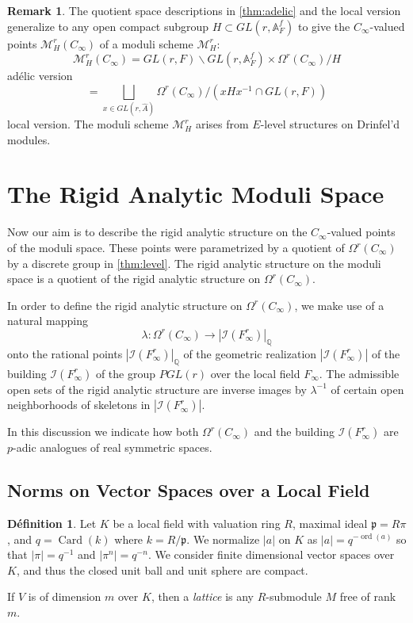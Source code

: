 \documentclass[12pt,a4paper]{article}
\theoremstyle{plain}
\theoremstyle{definition}
\newtheorem{definition}{D\'efinition}[section]
\newtheorem{remark}{Remark}[section]
\theoremstyle{remark}
\DeclareMathOperator{\Card}{Card}
\DeclareMathOperator{\ord}{ord}
\newcommand{\fp}{\mathfrak{p}}
\newcommand{\cI}{\mathcal{I}}
\newcommand{\bQ}{\mathbb{Q}}
\newcommand{\bA}{\mathbb{A}}
\newcommand{\cM}{\mathcal{M}}
\providecommand{\cI}{\mathcal{I}}
\providecommand{\cM}{\mathcal{M}}
\providecommand{\fp}{\mathfrak{p}}
\begin{document}
\begin{remark}
\label{rem:general}
The quotient space descriptions in \eqref{thm:adelic} and the local version generalize to any open compact subgroup $H \subset GL(r, \bA_F^f)$ to give the $C_\infty$-valued points $\cM_H^r(C_\infty)$ of a moduli scheme $\cM_H^r$:
\[
\cM_H^r(C_\infty) = GL(r, F) \backslash GL(r, \bA_F^f) \times \Omega^r(C_\infty) / H
\]
ad\'elic version
\[
= \bigsqcup_{x \in GL(r, \hat{A})} \Omega^r(C_\infty) / (xHx^{-1} \cap GL(r, F))
\]
local version. The moduli scheme $\cM_H^r$ arises from $E$-level structures on Drinfel'd modules.
\end{remark}

\newpage
\section{The Rigid Analytic Moduli Space}
\label{ch:rigid}

Now our aim is to describe the rigid analytic structure on the $C_\infty$-valued points of the moduli space. These points were parametrized by a quotient of $\Omega^r(C_\infty)$ by a discrete group in \eqref{thm:level}. The rigid analytic structure on the moduli space is a quotient of the rigid analytic structure on $\Omega^r(C_\infty)$.

In order to define the rigid analytic structure on $\Omega^r(C_\infty)$, we make use of a natural mapping
\[
\lambda: \Omega^r(C_\infty) \longrightarrow |\cI(F_\infty^r)|_\bQ
\]
onto the rational points $|\cI(F_\infty^r)|_\bQ$ of the geometric realization $|\cI(F_\infty^r)|$ of the building $\cI(F_\infty^r)$ of the group $PGL(r)$ over the local field $F_\infty$. The admissible open sets of the rigid analytic structure are inverse images by $\lambda^{-1}$ of certain open neighborhoods of skeletons in $|\cI(F_\infty^r)|$.

In this discussion we indicate how both $\Omega^r(C_\infty)$ and the building $\cI(F_\infty^r)$ are $p$-adic analogues of real symmetric spaces.

\subsection{Norms on Vector Spaces over a Local Field}
\label{sec:norms}

\begin{definition}
\label{def:localfield}
Let $K$ be a local field with valuation ring $R$, maximal ideal $\fp = R\pi$, and $q = \Card(k)$ where $k = R/\fp$. We normalize $|a|$ on $K$ as $|a| = q^{-\ord(a)}$ so that $|\pi| = q^{-1}$ and $|\pi^n| = q^{-n}$. We consider finite dimensional vector spaces over $K$, and thus the closed unit ball and unit sphere are compact.

If $V$ is of dimension $m$ over $K$, then a \emph{lattice} is any $R$-submodule $M$ free of rank $m$.
\end{definition}
\end{document}
